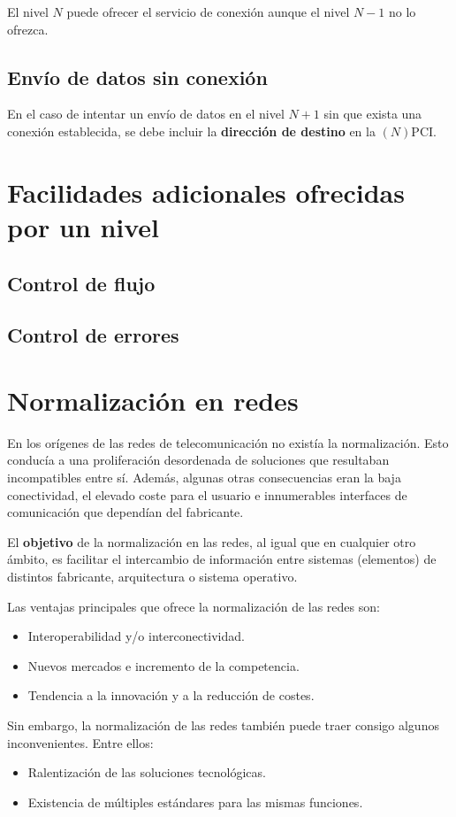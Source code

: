 \documentclass[a4paper]{book}
\numberwithin{figure}{chapter}
\numberwithin{equation}{subsection}
\begin{document}
El nivel $N$ puede ofrecer el servicio de conexión aunque el nivel $N-1$ no lo ofrezca.


\subsection{Envío de datos sin conexión}
En el caso de intentar un envío de datos en el nivel $N+1$ sin que exista una conexión establecida, se debe incluir la \textbf{dirección de destino} en la $(N)$PCI.

\section{Facilidades adicionales ofrecidas por un nivel}
\subsection{Control de flujo}
\subsection{Control de errores}

\section{Normalización en redes}
En los orígenes de las redes de telecomunicación no existía la normalización. Esto conducía a una proliferación desordenada de soluciones que resultaban incompatibles entre sí. Además, algunas otras consecuencias eran la baja conectividad, el elevado coste para el usuario e innumerables interfaces de comunicación que dependían del fabricante.

El \textbf{objetivo} de la normalización en las redes, al igual que en cualquier otro ámbito, es facilitar el intercambio de información entre sistemas (elementos) de distintos fabricante, arquitectura o sistema operativo.

Las ventajas principales que ofrece la normalización de las redes son:
\begin{itemize}
  \item Interoperabilidad y/o interconectividad.
  \item Nuevos mercados e incremento de la competencia.
  \item Tendencia a la innovación y a la reducción de costes.
\end{itemize}

Sin embargo, la normalización de las redes también puede traer consigo algunos inconvenientes. Entre ellos:
\begin{itemize}
  \item Ralentización de las soluciones tecnológicas.
  \item Existencia de múltiples estándares para las mismas funciones.
\end{itemize}
\end{document}
